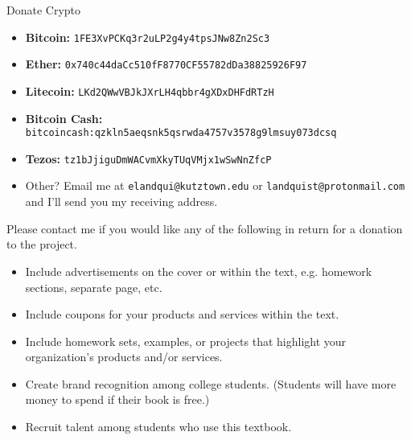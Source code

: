 \noindent Donate Crypto
\begin{itemize}
    \item {\bf Bitcoin:} {\tt 1FE3XvPCKq3r2uLP2g4y4tpsJNw8Zn2Sc3}
    \item {\bf Ether:} {\tt 0x740c44daCc510fF8770CF55782dDa38825926F97}
    \item {\bf Litecoin:} {\tt LKd2QWwVBJkJXrLH4qbbr4gXDxDHFdRTzH}
    \item {\bf Bitcoin Cash:} {\tt bitcoincash:qzkln5aeqsnk5qsrwda4757v3578g9lmsuy073dcsq}
    \item {\bf Tezos:} {\tt tz1bJjiguDmWACvmXkyTUqVMjx1wSwNnZfcP}
    \item Other? Email me at {\tt elandqui@kutztown.edu} or {\tt landquist@protonmail.com} and I'll send you my receiving address.
\end{itemize}

\noindent Please contact me if you would like any of the following in return for a donation to the project.
\begin{itemize}
    \item Include advertisements on the cover or within the text, e.g. homework sections, separate page, etc.
    \item Include coupons for your products and services within the text.
    \item Include homework sets, examples, or projects that highlight your organization's products and/or services.
    \item Create brand recognition among college students. (Students will have more money to spend if their book is free.)
    \item Recruit talent among students who use this textbook.
\end{itemize}

